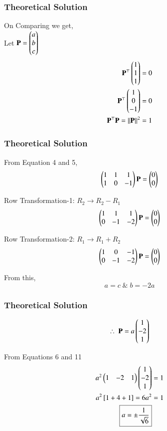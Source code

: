 \documentclass{beamer}
\begin{document}
\begin{frame}[fragile]
    \frametitle{Theoretical Solution}
On Comparing we get,\\
Let $\mathbf{P} = \begin{pmatrix}a \\ b \\c\end{pmatrix}$
\begin{align}
\mathbf{P}^\top\begin{pmatrix}1 \\ 1 \\ 1\end{pmatrix} &= 0\\
\mathbf{P}^\top\begin{pmatrix}1 \\ 0 \\ -1\end{pmatrix} &= 0\\
\mathbf{P}^\top\mathbf{P} = \left\lVert\mathbf{P}\right\rVert^2 &=  1
\end{align}
\end{frame}

\begin{frame}[fragile]
    \frametitle{Theoretical Solution}
From Equation 4 and 5,
\begin{equation}
    \begin{pmatrix}1 & 1 & 1 \\ 1 & 0 & -1\end{pmatrix}\mathbf{P} = \begin{pmatrix}0 \\ 0\end{pmatrix}
\end{equation}

Row Transformation-1: $R_2 \rightarrow R_2 - R_1$
\begin{equation}
    \begin{pmatrix}1 & 1 & 1 \\ 0 & -1 & -2\end{pmatrix}\mathbf{P} = \begin{pmatrix}0 \\ 0\end{pmatrix}
\end{equation}

Row Transformation-2: $R_1 \rightarrow R_1 + R_2$
\begin{equation}
    \begin{pmatrix}1 & 0 & -1 \\ 0 & -1 & -2\end{pmatrix}\mathbf{P} = \begin{pmatrix}0 \\ 0\end{pmatrix}
\end{equation}

From this,
\begin{equation}
    a = c \; \& \; b = -2a
\end{equation}
\end{frame}

\begin{frame}[fragile]
    \frametitle{Theoretical Solution}
\begin{equation}
  \therefore \;  \mathbf{P} = a\begin{pmatrix}1 \\ -2 \\ 1\end{pmatrix}
\end{equation}

From Equations 6 and 11
\begin{align}
   a^2 \begin{pmatrix}1 & -2 & 1\end{pmatrix} \begin{pmatrix}1 \\ -2 \\ 1\end{pmatrix} &= 1 \\ 
   a^2\left[ 1 + 4 + 1 \right] = 6a^2 &= 1\\
   \boxed{a = \pm \dfrac{1}{\sqrt{6}}}
\end{align}
\end{frame}
\end{document}
